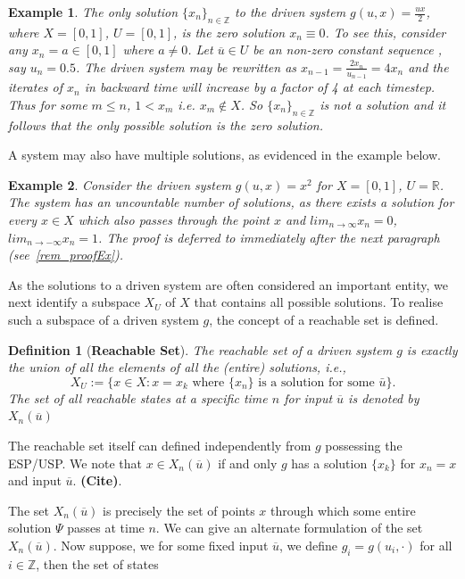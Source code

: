 \documentclass[a4paper,12pt,twoside]{report}
\newtheorem{Definition}{Definition}[]
\newtheorem{Example}{Example}[]
\begin{document}
\begin{Example} \rm \label{ex_halfux}
  The only solution  $\{x_n\}_{n\in\mathbb{Z}}$ to the driven system  $g(u,x)=\frac{ux}{2}$, where $X=[0,1]$, $U=[0,1]$,  is the zero solution $x_n\equiv0$.
  To see this, consider any $x_n=a\in[0,1]$ where $a\neq{0}$.  Let $\overline{u}\in{U}$ be an non-zero constant sequence , say $u_n=0.5$. 
  The driven system may be rewritten as $x_{n-1}=\frac{2x_n}{u_{n-1}}=4x_n$ and the  iterates of $x_n$ in backward time will increase by a factor of 4 at each timestep. 
  Thus for some $m\leq{n}$,  $1<x_m$ i.e. $x_m\notin{X}$. So ${\{x_n\}}_{n\in\mathbb{Z}}$ is not a solution and it follows that the only possible solution is the zero solution.
\end{Example}


A system may also have multiple solutions, as evidenced in the example below.

\begin{Example}\label{Ex_exp} \rm 
  Consider the driven system $g(u,x)=x^2$ for $X=[0,1]$, $U=\mathbb{R}$. The system has an uncountable number of solutions, as there exists a solution for every $x\in{X}$ which also passes through the point $x$ and $lim_{n\to\infty}x_n=0$, $lim_{n\to{-}\infty}x_n=1$.  
 The proof is deferred to immediately after the next paragraph (see~\ref{rem_proofEx}).
\end{Example}

As the solutions to a driven system are often considered an important entity, we next identify a subspace $X_U$ of $X$ that contains all possible solutions. To realise such a subspace of a driven system $g$, the concept of a reachable set is defined.

\begin{Definition}
  [\bf Reachable Set]\label{Dfn_ReachableSet}\rm
The reachable set of a driven system $g$ is exactly the union of all the elements of all the (entire) solutions, i.e., 
\[X_U :=\Big \{x \in X:  x = x_k \mbox{ where  $\{x_n\}$  is a solution for some  $\bar{u}$} \Big \}.\]
The set of all reachable states at a specific time $n$ for input $\overline{u}$ is denoted by $X_n(\overline{u})$
\end{Definition}

The reachable set itself can defined independently from $g$ possessing the ESP/USP. We note that $x\in{X_n(\overline{u})}$ if and only $g$ has a solution $\{x_k\}$ for $x_n=x$ and input $\overline{u}$. \textbf{(Cite)}.


The set $X_n(\overline{u})$ is precisely the set of points $x$ through which some entire solution $\Psi$ passes at time $n$. We can give an alternate formulation of the set $X_n(\overline{u})$. 
Now suppose, we for some fixed input 
$\overline{u}$, we define $g_i = g(u_i,\cdot)$ for all $i\in \mathbb{Z}$, then the set of states
\end{document}
